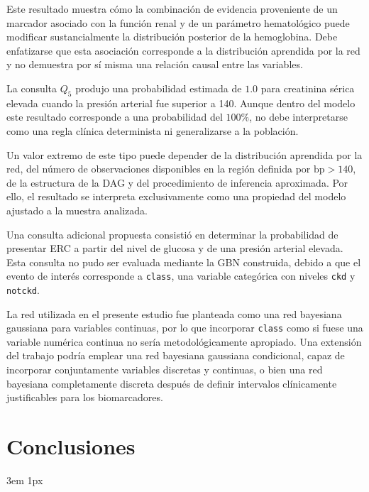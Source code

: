 \documentclass{Academic}
\begin{document}
Este resultado muestra cómo la combinación de evidencia proveniente de un
marcador asociado con la función renal y de un parámetro hematológico puede
modificar sustancialmente la distribución posterior de la hemoglobina.
Debe enfatizarse que esta asociación corresponde a la distribución aprendida
por la red y no demuestra por sí misma una relación causal entre las
variables.

La consulta $Q_5$ produjo una probabilidad estimada de $1.0$ para creatinina
sérica elevada cuando la presión arterial fue superior a 140. Aunque dentro
del modelo este resultado corresponde a una probabilidad del $100\%$, no
debe interpretarse como una regla clínica determinista ni generalizarse a
la población.

Un valor extremo de este tipo puede depender de la distribución aprendida
por la red, del número de observaciones disponibles en la región definida
por $\mathrm{bp}>140$, de la estructura de la DAG y del procedimiento de
inferencia aproximada. Por ello, el resultado se interpreta exclusivamente
como una propiedad del modelo ajustado a la muestra analizada.

Una consulta adicional propuesta consistió en determinar la probabilidad de
presentar ERC a partir del nivel de glucosa y de una presión arterial elevada.
Esta consulta no pudo ser evaluada mediante la GBN construida, debido a que
el evento de interés corresponde a \texttt{class}, una variable categórica
con niveles \texttt{ckd} y \texttt{notckd}.

La red utilizada en el presente estudio fue planteada como una red bayesiana
gaussiana para variables continuas, por lo que incorporar \texttt{class}
como si fuese una variable numérica continua no sería metodológicamente
apropiado. Una extensión del trabajo podría emplear una red bayesiana
gaussiana condicional, capaz de incorporar conjuntamente variables discretas
y continuas, o bien una red bayesiana completamente discreta después de
definir intervalos clínicamente justificables para los biomarcadores.

\section{Conclusiones}


\singlespacing
\emergencystretch 3em
\hfuzz 1px
\printbibliography[heading=bibnumbered]




\end{document}
